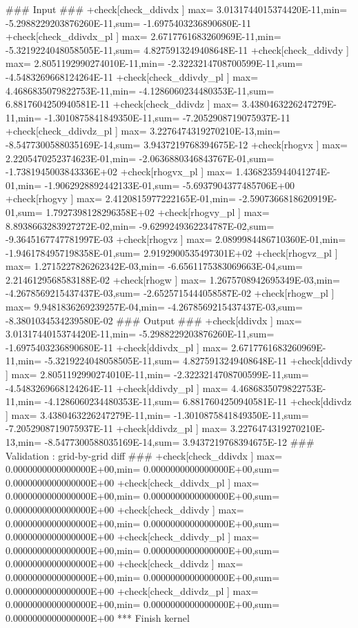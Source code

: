 \begin{LstLog}
 ### Input ###
 +check[check_ddivdx    ] max=  3.0131744015374420E-11,min= -5.2988229203876260E-11,sum= -1.6975403236890680E-11
 +check[check_ddivdx_pl ] max=  2.6717761683260969E-11,min= -5.3219224048058505E-11,sum=  4.8275913249408648E-11
 +check[check_ddivdy    ] max=  2.8051192990274010E-11,min= -2.3223214708700599E-11,sum= -4.5483269668124264E-11
 +check[check_ddivdy_pl ] max=  4.4686835079822753E-11,min= -4.1286060234480353E-11,sum=  6.8817604250940581E-11
 +check[check_ddivdz    ] max=  3.4380463226247279E-11,min= -1.3010875841849350E-11,sum= -7.2052908719075937E-11
 +check[check_ddivdz_pl ] max=  3.2276474319270210E-13,min= -8.5477300588035169E-14,sum=  3.9437219768394675E-12
 +check[rhogvx          ] max=  2.2205470252374623E-01,min= -2.0636880346843767E-01,sum= -1.7381945003843336E+02
 +check[rhogvx_pl       ] max=  1.4368235944041274E-01,min= -1.9062928892442133E-01,sum= -5.6937904377485706E+00
 +check[rhogvy          ] max=  2.4120815977222165E-01,min= -2.5907366818620919E-01,sum=  1.7927398128296358E+02
 +check[rhogvy_pl       ] max=  8.8938663283927272E-02,min= -9.6299249362234787E-02,sum= -9.3645167747781997E-03
 +check[rhogvz          ] max=  2.0899984486710360E-01,min= -1.9461784957198358E-01,sum=  2.9192900535497301E+02
 +check[rhogvz_pl       ] max=  1.2715227826262342E-03,min= -6.6561175383069663E-04,sum=  2.2146129568583188E-02
 +check[rhogw           ] max=  1.2675708942695349E-03,min= -4.2678569215437437E-03,sum= -2.6525715444058587E-02
 +check[rhogw_pl        ] max=  9.9481836269239257E-04,min= -4.2678569215437437E-03,sum= -8.3801034534239580E-02
 ### Output ###
 +check[ddivdx          ] max=  3.0131744015374420E-11,min= -5.2988229203876260E-11,sum= -1.6975403236890680E-11
 +check[ddivdx_pl       ] max=  2.6717761683260969E-11,min= -5.3219224048058505E-11,sum=  4.8275913249408648E-11
 +check[ddivdy          ] max=  2.8051192990274010E-11,min= -2.3223214708700599E-11,sum= -4.5483269668124264E-11
 +check[ddivdy_pl       ] max=  4.4686835079822753E-11,min= -4.1286060234480353E-11,sum=  6.8817604250940581E-11
 +check[ddivdz          ] max=  3.4380463226247279E-11,min= -1.3010875841849350E-11,sum= -7.2052908719075937E-11
 +check[ddivdz_pl       ] max=  3.2276474319270210E-13,min= -8.5477300588035169E-14,sum=  3.9437219768394675E-12
 ### Validation : grid-by-grid diff ###
 +check[check_ddivdx    ] max=  0.0000000000000000E+00,min=  0.0000000000000000E+00,sum=  0.0000000000000000E+00
 +check[check_ddivdx_pl ] max=  0.0000000000000000E+00,min=  0.0000000000000000E+00,sum=  0.0000000000000000E+00
 +check[check_ddivdy    ] max=  0.0000000000000000E+00,min=  0.0000000000000000E+00,sum=  0.0000000000000000E+00
 +check[check_ddivdy_pl ] max=  0.0000000000000000E+00,min=  0.0000000000000000E+00,sum=  0.0000000000000000E+00
 +check[check_ddivdz    ] max=  0.0000000000000000E+00,min=  0.0000000000000000E+00,sum=  0.0000000000000000E+00
 +check[check_ddivdz_pl ] max=  0.0000000000000000E+00,min=  0.0000000000000000E+00,sum=  0.0000000000000000E+00
 *** Finish kernel
\end{LstLog}

